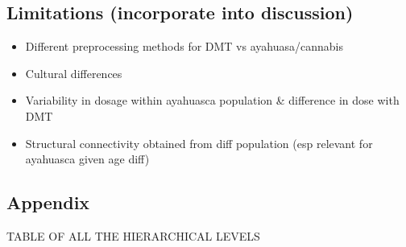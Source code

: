 










\subsection{Limitations (incorporate into
discussion)}\label{limitations-incorporate-into-discussion}

\begin{itemize}
\tightlist
\item
  Different preprocessing methods for DMT vs ayahuasa/cannabis
\item
  Cultural differences
\item
  Variability in dosage within ayahuasca population \& difference in
  dose with DMT
\item
  Structural connectivity obtained from diff population (esp relevant
  for ayahuasca given age diff)
\end{itemize}

\subsection{Appendix}\label{appendix}

TABLE OF ALL THE HIERARCHICAL LEVELS

